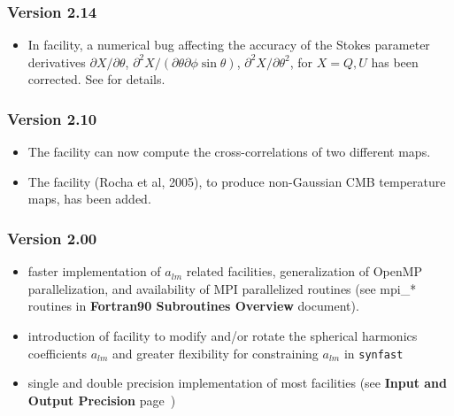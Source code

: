 \documentclass[12pt,twoside]{article}
\renewcommand{\ell}{l}
\newcommand{\compresslist}{%
\setlength{\itemsep}{0ex}}{}
\begin{document}
{%
\subsubsection{Version 2.14}
\begin{itemize}\compresslist
\item In  facility, a numerical bug affecting the accuracy of the Stokes parameter derivatives 
$\partial X/\partial\theta$, 
$\partial^2 X/(\partial\theta\partial\phi\sin\theta)$, 
$\partial^2 X/\partial \theta^2$, 
for $X=Q,U$ has been corrected. See  for details.
\end{itemize}

\subsubsection{Version 2.10}
\begin{itemize}\compresslist
\item The  facility can now compute the cross-correlations of two different
maps. 
\item The  facility (Rocha et al, 2005), to produce non-Gaussian CMB temperature maps,
has been added.
\end{itemize}

\subsubsection{Version 2.00}
\begin{itemize}\compresslist
\item faster implementation of $a_{\ell m}$ related facilities, generalization of
  OpenMP parallelization, and availability of MPI parallelized routines (see
  mpi\_* routines in {\bf Fortran90 Subroutines Overview} document).
\item introduction of  facility to modify and/or rotate the spherical
  harmonics coefficients $a_{\ell m}$ and greater flexibility for constraining
  $a_{\ell m}$ in {\tt synfast}
\item single and double precision implementation of most facilities (see {\bf {Input and Output Precision}}
  page~\pageref{page:ioprec})
\end{itemize}
}%
\end{document}
